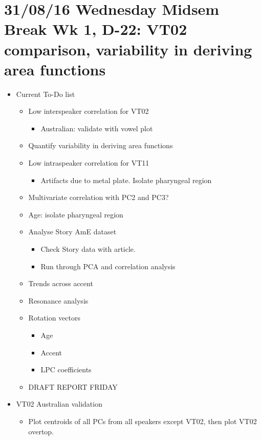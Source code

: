 \documentclass{article}
\begin{document}
\section*{31/08/16 Wednesday Midsem Break Wk 1, D-22: VT02 comparison, variability in deriving area functions}
\begin{itemize}
    \item Current To-Do list
    \begin{itemize}
        \item Low interspeaker correlation for VT02
        \begin{itemize}
            \item Australian: validate with vowel plot
        \end{itemize}
        \item Quantify variability in deriving area functions
        \item Low intraspeaker correlation for VT11
        \begin{itemize}
            \item Artifacts due to metal plate. Isolate pharyngeal region
        \end{itemize}
        \item Multivariate correlation with PC2 and PC3?
        \item Age: isolate pharyngeal region
        \item Analyse Story AmE dataset
        \begin{itemize}
            \item Check Story data with article.
            \item Run through PCA and correlation analysis
        \end{itemize}
        \item Trends across accent
        \item Resonance analysis
        \item Rotation vectors
        \begin{itemize}
            \item Age
            \item Accent
            \item LPC coefficients
        \end{itemize}
        \item DRAFT REPORT FRIDAY
    \end{itemize}
    \item VT02 Australian validation
    \begin{itemize}
        \item Plot centroids of all PCs from all speakers except VT02, then plot VT02 overtop.

\end{itemize}
\end{itemize}
\end{document}

